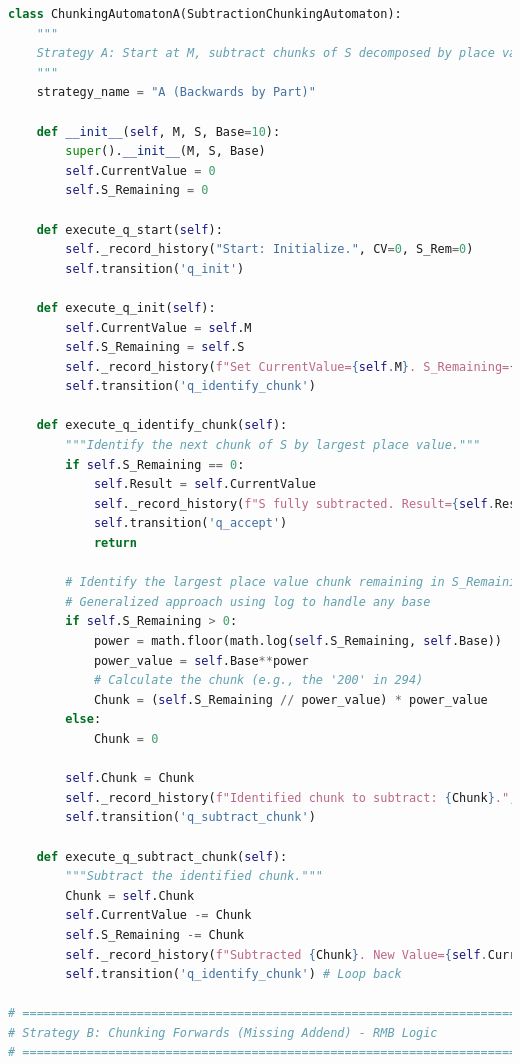 \documentclass[11pt]{article}
\begin{document}
\begin{lstlisting}[language=Python]
class ChunkingAutomatonA(SubtractionChunkingAutomaton):
    """
    Strategy A: Start at M, subtract chunks of S decomposed by place value.
    """
    strategy_name = "A (Backwards by Part)"
    
    def __init__(self, M, S, Base=10):
        super().__init__(M, S, Base)
        self.CurrentValue = 0
        self.S_Remaining = 0

    def execute_q_start(self):
        self._record_history("Start: Initialize.", CV=0, S_Rem=0)
        self.transition('q_init')

    def execute_q_init(self):
        self.CurrentValue = self.M
        self.S_Remaining = self.S
        self._record_history(f"Set CurrentValue={self.M}. S_Remaining={self.S}.", CV=self.CurrentValue, S_Rem=self.S_Remaining)
        self.transition('q_identify_chunk')

    def execute_q_identify_chunk(self):
        """Identify the next chunk of S by largest place value."""
        if self.S_Remaining == 0:
            self.Result = self.CurrentValue
            self._record_history(f"S fully subtracted. Result={self.Result}.", CV=self.CurrentValue, S_Rem=0)
            self.transition('q_accept')
            return

        # Identify the largest place value chunk remaining in S_Remaining
        # Generalized approach using log to handle any base
        if self.S_Remaining > 0:
            power = math.floor(math.log(self.S_Remaining, self.Base))
            power_value = self.Base**power
            # Calculate the chunk (e.g., the '200' in 294)
            Chunk = (self.S_Remaining // power_value) * power_value
        else:
            Chunk = 0

        self.Chunk = Chunk
        self._record_history(f"Identified chunk to subtract: {Chunk}.", CV=self.CurrentValue, S_Rem=self.S_Remaining)
        self.transition('q_subtract_chunk')

    def execute_q_subtract_chunk(self):
        """Subtract the identified chunk."""
        Chunk = self.Chunk
        self.CurrentValue -= Chunk
        self.S_Remaining -= Chunk
        self._record_history(f"Subtracted {Chunk}. New Value={self.CurrentValue}.", CV=self.CurrentValue, S_Rem=self.S_Remaining)
        self.transition('q_identify_chunk') # Loop back

# =============================================================================
# Strategy B: Chunking Forwards (Missing Addend) - RMB Logic
# =============================================================================


\end{lstlisting}
\end{document}

